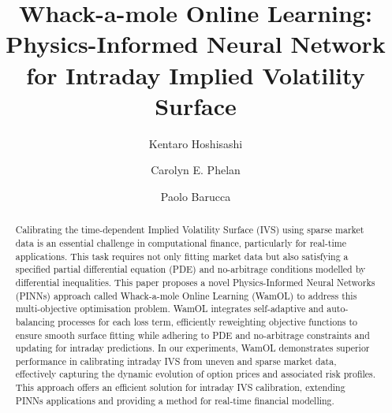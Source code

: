 \documentclass[sigconf, authorversion=true, nonacm=true]{acmart}
\begin{document}
\title[Whack-a-mole Online Learning]{Whack-a-mole Online Learning: Physics-Informed Neural Network for Intraday Implied Volatility Surface}

\author{Kentaro Hoshisashi}
\author{Carolyn E. Phelan}
\author{Paolo Barucca}

\renewcommand{\shortauthors}{Hoshisashi, et al.}

\begin{abstract}
Calibrating the time-dependent Implied Volatility Surface (IVS) using sparse market data is an essential challenge in computational finance, particularly for real-time applications. This task requires not only fitting market data but also satisfying a specified partial differential equation (PDE) and no-arbitrage conditions modelled by differential inequalities. This paper proposes a novel Physics-Informed Neural Networks (PINNs) approach called Whack-a-mole Online Learning (WamOL) to address this multi-objective optimisation problem. WamOL integrates self-adaptive and auto-balancing processes for each loss term, efficiently reweighting objective functions to ensure smooth surface fitting while adhering to PDE and no-arbitrage constraints and updating for intraday predictions. In our experiments, WamOL demonstrates superior performance in calibrating intraday IVS from uneven and sparse market data, effectively capturing the dynamic evolution of option prices and associated risk profiles. This approach offers an efficient solution for intraday IVS calibration, extending PINNs applications and providing a method for real-time financial modelling.
\end{abstract}
\end{document}
